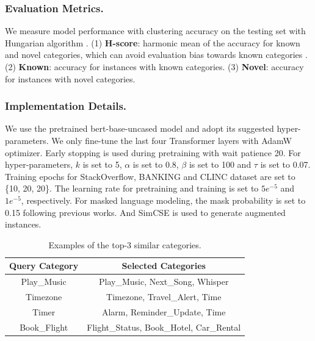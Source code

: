 \documentclass[letterpaper]{article} %
\begin{document}
\subsubsection{Evaluation Metrics.}
We measure model performance with clustering accuracy on the testing set with Hungarian algorithm \citep{hungarian}.
(1) \textbf{H-score}: harmonic mean of the accuracy for known and novel categories, which can avoid evaluation bias towards known categories \citep{hscore}.
(2) \textbf{Known}: accuracy for instances with known categories.
(3) \textbf{Novel}: accuracy for instances with novel categories.





















\subsubsection{Implementation Details.}
We use the pretrained bert-base-uncased model \citep{huggingface} and adopt its suggested hyper-parameters. We only fine-tune the last four Transformer layers with AdamW optimizer.
Early stopping is used during pretraining with wait patience 20.
For hyper-parameters, $k$ is set to 5, $\alpha$ is set to 0.8, $\beta$ is set to 100 and $\tau$ is set to 0.07.
Training epochs for StackOverflow, BANKING and CLINC dataset are set to \{10, 20, 20\}. The learning rate for pretraining and training is set to $5e^{-5}$ and $1e^{-5}$, respectively.
For masked language modeling, the mask probability is set to 0.15 following previous works. And SimCSE \citep{simcse} is used to generate augmented instances.




\begin{table}
\setlength\tabcolsep{4pt}
\centering
\begin{tabular}{cc}
\toprule
\textbf{Query Category}    & \textbf{Selected Categories} \\
\midrule
Play\_Music &Play\_Music, Next\_Song, Whisper \\
Timezone & Timezone, Travel\_Alert, Time \\
\midrule
Timer & Alarm, Reminder\_Update, Time \\
Book\_Flight & Flight\_Status, Book\_Hotel, Car\_Rental \\
\bottomrule

\end{tabular}
\caption{Examples of the top-3 similar categories.}
\label{table3}
\end{table}
\end{document}
